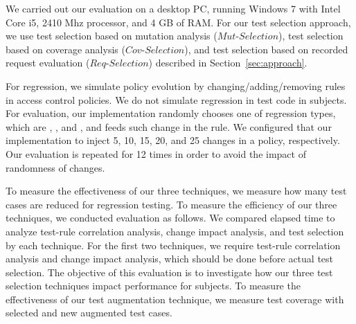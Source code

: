 We carried out our evaluation on a desktop PC, running Windows 7 with Intel Core i5, 2410 Mhz processor, and 4 GB of RAM. 
For our test selection approach, we use test selection based on mutation analysis ($Mut$-$Selection$),
test selection based on coverage analysis ($Cov$-$Selection$), and
test selection based on recorded request evaluation ($Req$-$Selection$)
described in Section~\ref{sec:approach}.

For regression, we simulate policy evolution by changing/adding/removing rules in access control policies.
We do not simulate regression in test code in subjects. For evaluation,
our implementation randomly chooses one of regression types, which are , ,
and , and feeds such change in the rule. We configured that our implementation
to inject 5, 10, 15, 20, and 25 changes in a policy, respectively.
Our evaluation is repeated for 12 times in order to avoid the impact of randomness of changes.

To measure the effectiveness of our three techniques,
we measure how many test cases are reduced for regression testing.
To measure the efficiency of our three techniques, we conducted evaluation as follows. 
We compared elapsed time to analyze test-rule correlation analysis,
change impact analysis, and test selection by each technique.
For the first two techniques, we require test-rule correlation analysis
and change impact analysis, which should be done before actual test selection.
The objective of this evaluation is to investigate how our three test selection techniques impact performance for subjects.
To measure the effectiveness of our test augmentation technique,
we measure test coverage with selected and new augmented test cases.




  
%
%

